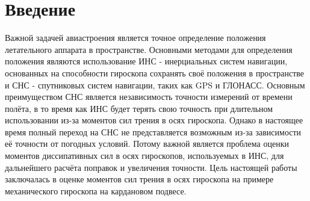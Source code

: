 \documentclass[12pt]{article}
\begin{document}
\section{Введение}
Важной задачей авиастроения является точное определение положения летательного аппарата в пространстве. Основными методами для определения положения 
являются использование ИНС - инерциальных систем навигации, основанных на способности гироскопа сохранять своё положения в пространстве и
СНС - спутниковых систем навигации, таких как GPS и ГЛОНАСС. Основным преимуществом СНС является независимость точности измерений от времени полёта,
в то время как ИНС будет терять свою точность при длительном использовании из-за моментов сил трения в осях гироскопа. Однако в настоящее 
время полный переход на СНС не представляется возможным из-за зависимости её точности от погодных условий. Потому важной является проблема 
оценки моментов диссипативных сил в осях гироскопов, используемых в ИНС, для дальнейшего расчёта поправок и увеличения точности. Цель настоящей 
работы заключалась в оценке моментов сил трения в осях гироскопа на примере механического гироскопа на кардановом подвесе.
\end{document}
